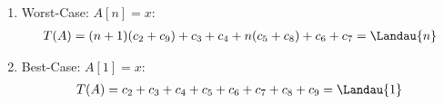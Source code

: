 \begin{solution}
\begin{enumerate}[label = (\alph*)]
\begin{enumerate}[label = \arabic*.]
    \item Worst-Case:
    $A[n] = x:$
    \begin{align*}
      T(A) = (n+1)(c_2 + c_9) + c_3 + c_4 + n(c_5 + c_8) + c_6 + c_7 = \Landau{n}
    \end{align*}
  
    \item Best-Case:
    $A[1] = x:$
    \begin{align*}
      T(A) = c_2 + c_3 + c_4 + c_5 + c_6 + c_7 + c_8 + c_9 = \Landau{1}
    \end{align*}
  
  \end{enumerate}

\end{enumerate}

\end{solution}

